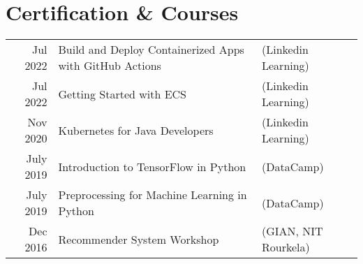 \documentclass[a4paper,12pt]{article}
\begin{document}
\begin{tabularx}{\linewidth}{ @{}l r@{} }
\end{tabularx}

\section{Certification \& Courses}
\begin{tabular}{rll}
 Jul 2022  & Build and Deploy Containerized Apps with GitHub Actions & (Linkedin Learning)\\
 Jul 2022  & Getting Started with ECS & (Linkedin Learning)\\
 Nov 2020  & Kubernetes for Java Developers & (Linkedin Learning)\\
 July 2019 & Introduction to TensorFlow in Python & (DataCamp)\\
 July 2019 & Preprocessing for Machine Learning in Python & (DataCamp)\\
 Dec 2016  & Recommender System Workshop & (GIAN, NIT Rourkela)
\end{tabular}
\end{document}
